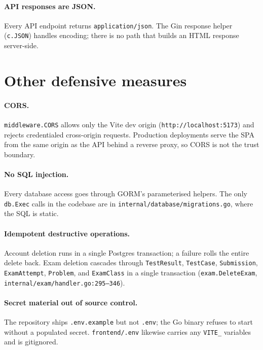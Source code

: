 \paragraph{API responses are JSON.} Every API endpoint returns \texttt{application/json}. The Gin response helper (\texttt{c.JSON}) handles encoding; there is no path that builds an HTML response server-side.

\section{Other defensive measures}

\paragraph{CORS.} \texttt{middleware.CORS} allows only the Vite dev origin (\texttt{http://localhost:5173}) and rejects credentialed cross-origin requests. Production deployments serve the SPA from the same origin as the API behind a reverse proxy, so CORS is not the trust boundary.

\paragraph{No SQL injection.} Every database access goes through GORM's parameterised helpers. The only \texttt{db.Exec} calls in the codebase are in \texttt{internal/database/migrations.go}, where the SQL is static.

\paragraph{Idempotent destructive operations.} Account deletion runs in a single Postgres transaction; a failure rolls the entire delete back. Exam deletion cascades through \texttt{TestResult}, \texttt{TestCase}, \texttt{Submission}, \texttt{ExamAttempt}, \texttt{Problem}, and \texttt{ExamClass} in a single transaction (\texttt{exam.DeleteExam}, \texttt{internal/exam/handler.go:295--346}).

\paragraph{Secret material out of source control.} The repository ships \texttt{.env.example} but not \texttt{.env}; the Go binary refuses to start without a populated secret. \texttt{frontend/.env} likewise carries any \texttt{VITE\_} variables and is gitignored.

